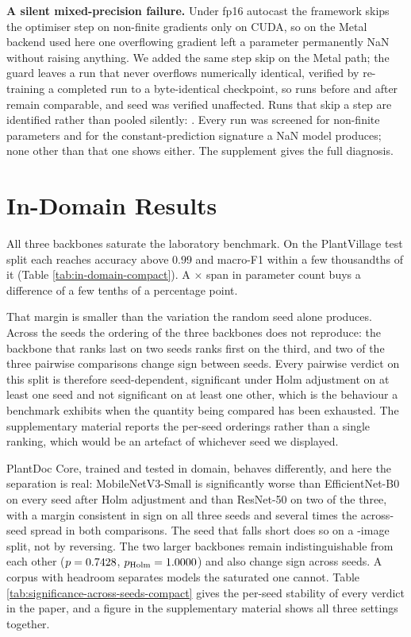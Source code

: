 \documentclass[runningheads]{llncs}
\begin{document}
\textbf{A silent mixed-precision failure.} Under fp16 autocast the framework
skips the optimiser step on non-finite gradients only on CUDA, so on the Metal
backend used here one overflowing gradient left a parameter permanently NaN
without raising anything. We added the same step skip on the Metal path; the
guard leaves a run that never overflows numerically identical, verified by
re-training a completed run to a byte-identical checkpoint, so runs before and
after remain comparable, and seed \SigSeed{} was verified unaffected. Runs that
skip a step are identified rather than pooled silently: \SkippedStepsNote{}.
Every run was screened for non-finite parameters and for the constant-prediction
signature a NaN model produces; none other than that one shows either. The
supplement gives the full diagnosis.

\section{In-Domain Results}
\label{sec:indomain}

All three backbones saturate the laboratory benchmark. On the PlantVillage test
split each reaches accuracy above $0.99$ and macro-F1 within a few thousandths
of it (Table \ref{tab:in-domain-compact}). A \ParamRatio{}$\times$ span in
parameter count buys a difference of a few tenths of a percentage point.



That margin is smaller than the variation the random seed alone produces. Across
the \NSeedsDone{} seeds the ordering of the three backbones does not reproduce:
the backbone that ranks last on two seeds ranks first on the third, and two of
the three pairwise comparisons change sign between seeds. Every pairwise verdict
on this split is therefore seed-dependent, significant under Holm adjustment on
at least one seed and not significant on at least one other, which is the
behaviour a benchmark exhibits when the quantity being compared has been
exhausted. The supplementary material reports the per-seed orderings rather than
a single ranking, which would be an artefact of whichever seed we displayed.

PlantDoc Core, trained and tested in domain, behaves differently, and here the
separation is real: MobileNetV3-Small is significantly worse than
EfficientNet-B0 on every seed after Holm adjustment and than ResNet-50 on two of
the three, with a margin consistent in sign on all three seeds and several times
the across-seed spread in both comparisons. The seed that falls short does so on
a \NPdcTest{}-image split, not by reversing. The two larger backbones remain
indistinguishable from each other ($p = 0.7428{}$, $p_{\mathrm{Holm}} =
1.0000{}$) and also change sign across seeds. A corpus with headroom
separates models the saturated one cannot. Table \ref{tab:significance-across-seeds-compact}
gives the per-seed stability of every verdict in the paper, and a figure in the
supplementary material shows all three settings together.
\end{document}
